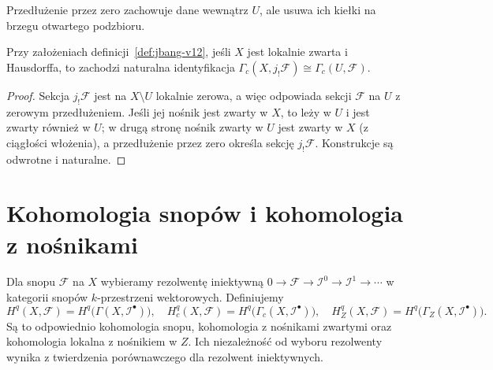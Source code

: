 \begin{center}
\par\smallskip\small Przedłużenie przez zero zachowuje dane wewnątrz $U$,
ale usuwa ich kiełki na brzegu otwartego podzbioru.
\end{center}

\begin{stwierdzenie}
\label{prop:jbang-sections-v12}
Przy założeniach definicji~\ref{def:jbang-v12}, jeśli $X$ jest lokalnie
zwarta i Hausdorffa, to zachodzi naturalna identyfikacja
$\Gamma_c(X,j_!\mathcal F)\cong\Gamma_c(U,\mathcal F)$.
\end{stwierdzenie}
\begin{proof}
Sekcja $j_!\mathcal F$ jest na $X\setminus U$ lokalnie zerowa,
a więc odpowiada sekcji $\mathcal F$ na $U$ z zerowym przedłużeniem.
Jeśli jej nośnik jest zwarty w $X$, to leży w $U$ i jest
zwarty również w $U$; w drugą stronę nośnik zwarty w $U$
jest zwarty w $X$ (z ciągłości włożenia), a przedłużenie
przez zero określa sekcję $j_!\mathcal F$.
Konstrukcje są odwrotne i naturalne.
\end{proof}

\section{Kohomologia snopów i kohomologia z nośnikami}
\begin{definicja}
\label{def:sheaf-cohom-v12}
Dla snopu $\mathcal F$ na $X$ wybieramy rezolwentę iniektywną
$0\to\mathcal F\to\mathcal I^0\to\mathcal I^1\to\cdots$
w kategorii snopów $k$-przestrzeni wektorowych. Definiujemy
\[
H^q(X,\mathcal F)=H^q\bigl(\Gamma(X,\mathcal I^\bullet)\bigr),
\quad H_c^q(X,\mathcal F)
=H^q\bigl(\Gamma_c(X,\mathcal I^\bullet)\bigr),
\quad H_Z^q(X,\mathcal F)
=H^q\bigl(\Gamma_Z(X,\mathcal I^\bullet)\bigr).
\]
Są to odpowiednio kohomologia snopu, kohomologia z nośnikami
zwartymi oraz kohomologia lokalna z nośnikiem w $Z$.
Ich niezależność od wyboru rezolwenty wynika z twierdzenia
porównawczego dla rezolwent iniektywnych.
\end{definicja}


